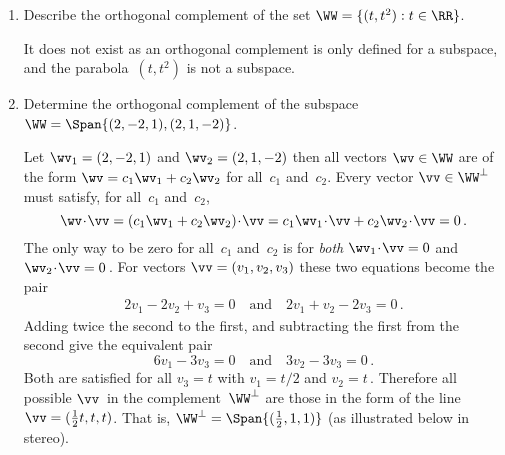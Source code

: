 \begin{example}
\begin{enumerate}
\item Describe the orthogonal complement of the set \(\WW=\{(t,t^2): t\in\RR\}\).
\begin{solution} 
It does not exist as an orthogonal complement is only defined for a subspace, and the parabola~\((t,t^2)\) is not a subspace.
\end{solution}



\item Determine the orthogonal complement of the subspace \(\WW=\Span\{(2,-2,1),(2,1,-2)\}\).
\begin{solution} 
Let \(\wv_1=(2,-2,1)\) and \(\wv_2=(2,1,-2)\) then all vectors \(\wv\in\WW\) are of the form \(\wv=c_1\wv_1+c_2\wv_2\) for all~\(c_1\) and~\(c_2\).
Every vector \(\vv\in\WW^\perp\) must satisfy, for all~\(c_1\) and~\(c_2\),
\begin{equation*}
\wv\cdot\vv=(c_1\wv_1+c_2\wv_2)\cdot\vv
=c_1\wv_1\cdot\vv+c_2\wv_2\cdot\vv
=0\,.
\end{equation*}
The only way to be zero for all~\(c_1\) and~\(c_2\) is for \emph{both} \(\wv_1\cdot\vv=0\) and \(\wv_2\cdot\vv=0\)\,.
For vectors \(\vv=(v_1,v_2,v_3)\) these two equations become the pair
\begin{eqnarray*}
2v_1-2v_2+v_3=0 \quad\text{and}\quad 2v_1+v_2-2v_3=0\,.
\end{eqnarray*}
Adding twice the second to the first, and subtracting the first from the second give the equivalent pair
\begin{equation*}
6v_1-3v_3=0\quad\text{and}\quad 3v_2-3v_3=0\,.
\end{equation*}
Both are satisfied for all \(v_3=t\) with \(v_1=t/2\) and \(v_2=t\)\,.
Therefore all possible \(\vv\)~in the complement~\(\WW^\perp\) are those in the form of the line \(\vv=(\tfrac12t,t,t)\).
That is, \(\WW^\perp=\Span\{(\tfrac12,1,1)\}\) (as illustrated below in stereo).
\begin{center}
\end{center}
\end{solution}

\end{enumerate}
\end{example}



